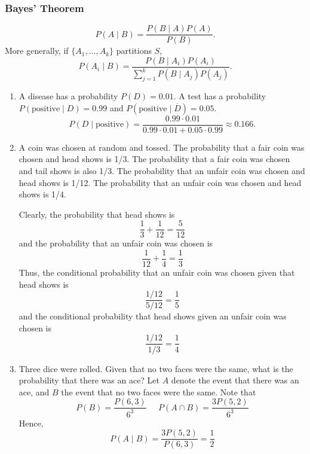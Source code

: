 \subsubsection{Bayes' Theorem}

\[
P(A \mid B)=\frac{P(B\mid A)P(A)}{P(B)}.
\]
More generally, if $\{A_1,\dots,A_k\}$ partitions $S$,
\[
P(A_i\mid B)=\frac{P(B\mid A_i)P(A_i)}{\sum_{j=1}^{k}P(B\mid A_j)P(A_j)}.
\]

\begin{example}
\begin{enumerate}
\item A disease has a probability  $P(D)=0.01$.
A test has a probability $P(\text{positive}\mid D)=0.99$ and $P(\text{positive}\mid \overline{D})=0.05$.
\[
P(D\mid\text{positive})
=\frac{0.99\cdot 0.01}{0.99\cdot0.01+0.05\cdot0.99}
\approx 0.166.
\]
\item A coin was chosen at random and tossed. The probability that a fair coin was chosen  and head shows is 1/3.  The probability that a fair coin was chosen  and tail shows is  also 1/3. The probability that an unfair coin was chosen  and head shows is 1/12. The probability that an unfair coin was chosen  and head shows is 1/4. 

Clearly, the probability that head shows is
\[
\frac{1}{3} + \frac{1}{12} =  \frac{5}{12}
\]
and the probability that an unfair coin was chosen is 
\[
\frac{1}{12} + \frac{1}{4} =  \frac{1}{3}
\]
Thus, the conditional probability that an unfair coin was chosen given that head shows is
\[
\frac{1/12}{5/12}  =  \frac{1}{5}
\]
and the conditional probability that head shows given an unfair coin was chosen is
\[
\frac{1/12}{1/3}  =  \frac{1}{4}
\]
\item Three dice were rolled. Given that no two faces were the same, what is the probability that there was an ace? Let $A$ denote the event that there was an ace, and $B$ the event that no two faces were the same. Note that
\[
P(B) = \frac{P(6,3)}{6^3} \;\;\;\;\; P(A \cap B) =  \frac{3P(5,2)}{6^3}
\]
Hence,
\[
P(A \mid B) =  \frac{3P(5,2)}{P(6,3)} = \frac{1}{2}
\]
\end{enumerate}
\end{example}
%
%
%

